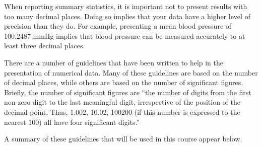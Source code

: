 \documentclass[
]{memoir}
\begin{document}
When reporting summary statistics, it is important not to present results with too many decimal places. Doing so implies that your data have a higher level of precision than they do. For example, presenting a mean blood pressure of 100.2487 mmHg implies that blood pressure can be measured accurately to at least three decimal places.

There are a number of guidelines that have been written to help in the presentation of numerical data. Many of these guidelines are based on the number of decimal places, while others are based on the number of significant figures. Briefly, the number of significant figures are ``the number of digits from the first non-zero digit to the last meaningful digit, irrespective of the position of the decimal point. Thus, 1.002, 10.02, 100200 (if this number is expressed to the nearest 100) all have four significant digits.'' \citet{armitage_etal13}

A summary of these guidelines that will be used in this course appear below.
\end{document}
